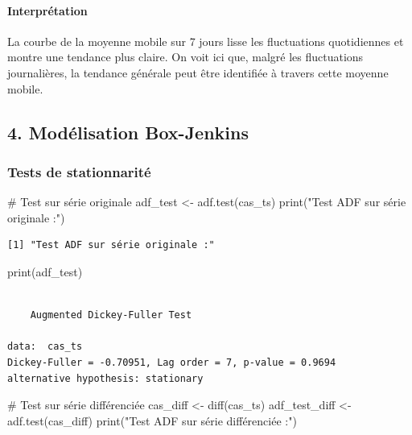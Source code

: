 \documentclass[
  letterpaper,
  DIV=11,
  numbers=noendperiod]{scrartcl}
\let\oldparagraph\paragraph
\renewcommand{\paragraph}[1]{\oldparagraph{#1}\mbox{}}
\newenvironment{Shaded}{\begin{snugshade}}{\end{snugshade}}
\newcommand{\CommentTok}[1]{\textcolor[rgb]{0.37,0.37,0.37}{#1}}
\newcommand{\FunctionTok}[1]{\textcolor[rgb]{0.28,0.35,0.67}{#1}}
\newcommand{\NormalTok}[1]{\textcolor[rgb]{0.00,0.23,0.31}{#1}}
\newcommand{\OtherTok}[1]{\textcolor[rgb]{0.00,0.23,0.31}{#1}}
\newcommand{\StringTok}[1]{\textcolor[rgb]{0.13,0.47,0.30}{#1}}
\begin{document}
\paragraph{\texorpdfstring{\textbf{Interprétation}}{Interprétation}}\label{interpruxe9tation-1}

La courbe de la moyenne mobile sur 7 jours lisse les fluctuations
quotidiennes et montre une tendance plus claire. On voit ici que, malgré
les fluctuations journalières, la tendance générale peut être identifiée
à travers cette moyenne mobile.

\subsection{4. Modélisation
Box-Jenkins}\label{moduxe9lisation-box-jenkins}

\subsubsection{Tests de stationnarité}\label{tests-de-stationnarituxe9}

\begin{Shaded}
\begin{Highlighting}[]
\CommentTok{\# Test sur série originale}
\NormalTok{adf\_test }\OtherTok{\textless{}{-}} \FunctionTok{adf.test}\NormalTok{(cas\_ts)}
\FunctionTok{print}\NormalTok{(}\StringTok{"Test ADF sur série originale :"}\NormalTok{)}
\end{Highlighting}
\end{Shaded}

\begin{verbatim}
[1] "Test ADF sur série originale :"
\end{verbatim}

\begin{Shaded}
\begin{Highlighting}[]
\FunctionTok{print}\NormalTok{(adf\_test)}
\end{Highlighting}
\end{Shaded}

\begin{verbatim}

    Augmented Dickey-Fuller Test

data:  cas_ts
Dickey-Fuller = -0.70951, Lag order = 7, p-value = 0.9694
alternative hypothesis: stationary
\end{verbatim}

\begin{Shaded}
\begin{Highlighting}[]
\CommentTok{\# Test sur série différenciée}
\NormalTok{cas\_diff }\OtherTok{\textless{}{-}} \FunctionTok{diff}\NormalTok{(cas\_ts)}
\NormalTok{adf\_test\_diff }\OtherTok{\textless{}{-}} \FunctionTok{adf.test}\NormalTok{(cas\_diff)}
\FunctionTok{print}\NormalTok{(}\StringTok{"Test ADF sur série différenciée :"}\NormalTok{)}
\end{Highlighting}
\end{Shaded}
\end{document}
